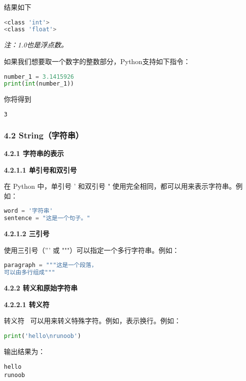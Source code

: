 结果如下

\begin{lstlisting}[language=bash]
<class 'int'>
<class 'float'>
\end{lstlisting}

\textsl{注：1.0也是浮点数。}

如果我们想要取一个数字的整数部分，Python支持如下指令：

\begin{lstlisting}[language=python]
number_1 = 3.1415926
print(int(number_1))
\end{lstlisting}

你将得到

\begin{lstlisting}[language=bash]
3
\end{lstlisting}

\subsubsection{4.2 String（字符串）}

\textbf{4.2.1 字符串的表示}

\textbf{4.2.1.1 单引号和双引号}

在 Python 中，单引号 ' 和双引号 " 使用完全相同，都可以用来表示字符串。例如：

\begin{lstlisting}[language=python]
word = '字符串'
sentence = "这是一个句子。"
\end{lstlisting}

\textbf{4.2.1.2 三引号}

使用三引号（''' 或 """）可以指定一个多行字符串。例如：

\begin{lstlisting}[language=python]
paragraph = """这是一个段落，
可以由多行组成"""
\end{lstlisting}

\textbf{4.2.2 转义和原始字符串}

\textbf{4.2.2.1 转义符}

转义符 \ 可以用来转义特殊字符。例如，\n 表示换行。例如：

\begin{lstlisting}[language=python]
print('hello\nrunoob')
\end{lstlisting}

输出结果为：

\begin{lstlisting}[language=pythonC]
hello
runoob
\end{lstlisting}

